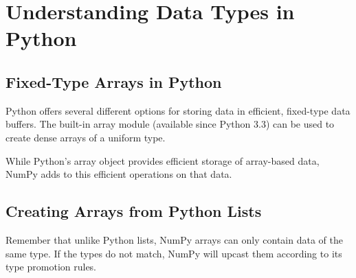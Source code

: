 \chapter{Understanding Data Types in Python}
\section{Fixed-Type Arrays in Python}
Python offers several different options for storing data in efficient, fixed-type data buffers. The built-in array module (available since Python 3.3) can be used to create dense arrays of a uniform type.

While Python's array object provides efficient storage of array-based data, NumPy adds to this efficient operations on that data.

\section{Creating Arrays from Python Lists}

Remember that unlike Python lists, NumPy arrays can only contain data of the same type. If the types do not match, NumPy will upcast them according to its type promotion rules.